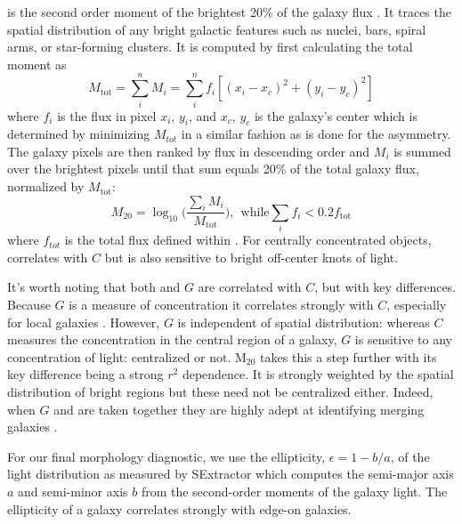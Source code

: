  is the second order moment of the brightest 20\% of the galaxy flux \citep{Lotz2004}. It traces the spatial distribution of any bright galactic features such as nuclei, bars, spiral arms, or star-forming clusters. It is computed by first calculating the total moment as
\begin{equation}
 M_{\mathrm{tot}} = \sum_i^n M_i = \sum_i^nf_i[(x_i-x_c)^2 + (y_i-y_c)^2] 
\end{equation}
where $f_i$ is the flux in pixel $x_i$, $y_i$, and $x_c$, $y_c$ is the galaxy's center which is determined by minimizing $M_{tot}$ in a similar fashion as is done for the asymmetry. The galaxy pixels are then ranked by flux in descending order and $M_i$ is summed over the brightest pixels until that sum equals 20\% of the total galaxy flux, normalized by $M_{\mathrm{tot}}$:
\begin{equation}
 M_{20} = \log_{10} \Big( \frac{\sum_iM_i}{M_{\mathrm{tot}}} \Big), ~~\textrm{while} \sum_if_i < 0.2f_{\mathrm{tot}}
\end{equation}
where $f_{tot}$ is the total flux defined within \rp. For centrally concentrated objects,  correlates with $C$ but is also sensitive to bright off-center knots of light. 

It's worth noting that both  and $G$ are correlated with $C$, but with key differences. Because $G$ is a measure of concentration it correlates strongly with $C$, especially for local galaxies \citep{Abraham2003}. However, $G$ is independent of spatial distribution: whereas $C$ measures the concentration in the central region of a galaxy, $G$ is sensitive to any concentration of light: centralized or not. M$_{20}$ takes this a step further with its key difference being a strong $r^2$ dependence. It is strongly weighted by the spatial distribution of bright regions but these need not be centralized either.  Indeed, when $G$ and  are taken together they are highly adept at identifying merging galaxies \citep{Lotz2004,Lotz2008}.  


For our final morphology diagnostic, we use the ellipticity, $\epsilon = 1 - b/a$, of the light distribution as measured by SExtractor which computes the semi-major axis $a$ and semi-minor axis $b$ from the second-order moments of the galaxy light. The ellipticity of a galaxy correlates strongly with edge-on galaxies. 

